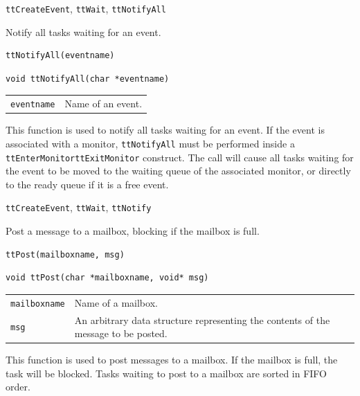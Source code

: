 \documentclass[final,twoside]{rapport}
\begin{document}
\seealso
{\tt ttCreateEvent}, {\tt ttWait}, {\tt ttNotifyAll}



\purpose
Notify all tasks waiting for an event.

\Msyntax
\begin{verbatim}
ttNotifyAll(eventname) 
\end{verbatim}

\Csyntax
\begin{verbatim}
void ttNotifyAll(char *eventname) 
\end{verbatim}

\args
\begin{tabularx}{\hsize}{l>{\raggedright\arraybackslash}X}
  {\tt eventname} & Name of an event.
\end{tabularx}

\descr This function is used to notify all tasks waiting for an event.
If the event is associated with a monitor, {\tt ttNotifyAll} must be
performed inside a \texttt{ttEnterMonitor\-ttExitMonitor} construct.
The call will cause all tasks waiting for the event to be moved to the
waiting queue of the associated monitor, or directly to the ready
queue if it is a free event.

\seealso
{\tt ttCreateEvent}, {\tt ttWait}, {\tt ttNotify}



\purpose
Post a message to a mailbox, blocking if the mailbox is full.

\Msyntax
\begin{verbatim}
ttPost(mailboxname, msg) 
\end{verbatim}

\Csyntax
\begin{verbatim}
void ttPost(char *mailboxname, void* msg) 
\end{verbatim}

\args
\begin{tabularx}{\hsize}{l>{\raggedright\arraybackslash}X}
  {\tt mailboxname} & Name of a mailbox. \\
  {\tt msg} & An arbitrary data structure representing the contents of
  the message to be posted. \\
\end{tabularx}

\descr This function is used to post messages to a mailbox. If
the mailbox is full, the task will be blocked. Tasks waiting to post
to a mailbox are sorted in FIFO order.
\end{document}
